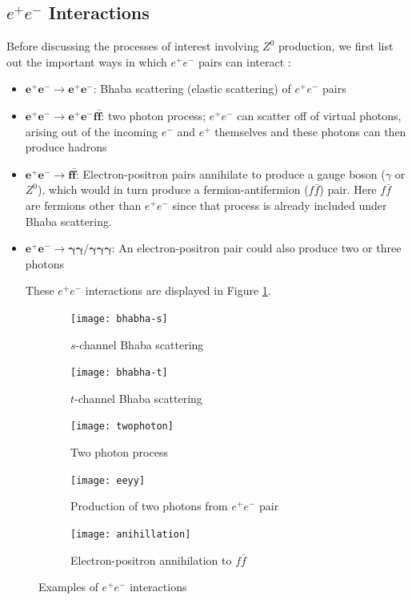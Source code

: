 \subsection{$e^{+}e^{-}$ Interactions}
Before discussing the processes of interest involving $Z^{0}$ production, we first list out the important ways in which $e^{+}e^{-}$ pairs can interact \cite{UB}:
\begin{itemize}
\item $\bm{e^{+}e^{-}\rightarrow e^{+}e^{-}}$: Bhaba scattering (elastic scattering) of $e^{+}e^{-}$ pairs 
\item $\bm{e^{+}e^{-}\rightarrow e^{+}e^{-}f \bar{f}}$: two photon process; $e^{+}e^{-}$ can scatter off of virtual photons, arising out of the incoming $e^{-}$ and $e^{+}$ themselves and these photons can then produce hadrons
\item $\bm{e^{+}e^{-}\rightarrow f \bar{f}}$: Electron-positron pairs annihilate to produce a gauge boson ($\gamma$ or $Z^{0}$), which would in turn produce a fermion-antifermion ($f\bar{f}$) pair. Here $f\bar{f}$ are fermions other than $e^{+}e^{-}$ since that process is already included under Bhaba scattering.
\item $\bm{e^{+}e^{-}\rightarrow \gamma \gamma / \gamma \gamma \gamma}$: An electron-positron pair could also produce two or three photons 

These $e^{+}e^{-}$ interactions are displayed in Figure \ref{fig:eeint}.

\end{itemize}

\begin{figure}[H]
\centering
\begin{subfigure}{0.4\textwidth}
    \texttt{[image: bhabha-s]}
    \caption{$s$-channel Bhaba scattering}
\end{subfigure}
\begin{subfigure}{0.4\textwidth}
    \texttt{[image: bhabha-t]}
    \caption{$t$-channel Bhaba scattering}
\end{subfigure}
\begin{subfigure}{0.4\textwidth}
\centering
    \texttt{[image: twophoton]}
    \caption{Two photon process}
\end{subfigure}
\begin{subfigure}{0.4\textwidth}
\centering
    \texttt{[image: eeyy]}
    \vspace{2em}
    \caption{Production of two photons from $e^{+}e^{-}$ pair}
\end{subfigure}
\begin{subfigure}{0.45\textwidth}
    \texttt{[image: anihillation]}
    \caption{Electron-positron annihilation to $f\bar{f}$}
\end{subfigure}
\caption[Examples of $e^{+}e^{-}$ interactions]{Examples of $e^{+}e^{-}$ interactions \cite{UB,Janot:2705419,qmdiaries}}
\label{fig:eeint}
\end{figure}

